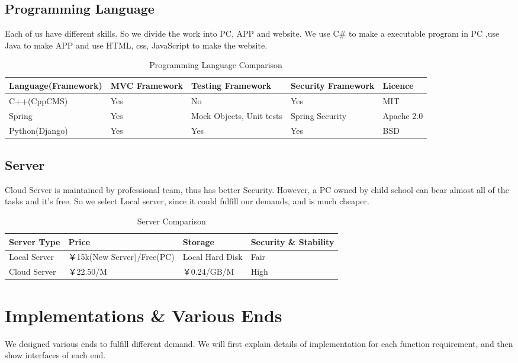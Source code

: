\documentclass{article}
\begin{document}
\subsection{Programming Language}
Each of us have different skills. So we divide the work into PC, APP and website. We use C\# to make a executable program in PC ,use Java to make APP and use HTML, css, JavaScript to make the website.

\begin{table}[htbp]
\centering
  \begin{tabular}{|l|p{2cm}|p{2cm}|p{2cm}|p{2cm}|}
  \hline
   Language(Framework) & MVC Framework & Testing Framework & Security Framework & Licence\\
    \hline
   C++(CppCMS) & Yes & No & Yes & MIT\\
    \hline

   Spring & Yes & Mock Objects, Unit tests & Spring Security & Apache 2.0\\
       \hline

   Python(Django) & Yes & Yes & Yes & BSD \\   
	\hline
     \end{tabular}
  \caption{Programming Language Comparison}
\end{table}

\subsection{Server}
Cloud Server is maintained by professional team, thus has better Security. However, a PC owned by child school can bear almost all of the tasks and it's free. So we select Local server, since it could fulfill our demands, and is much cheaper.

\begin{table}[htbp]
\centering
\begin{tabular}{|l|l|l|l|}
	\hline
	Server Type & Price & Storage & Security \& Stability \\
	\hline
	Local Server & ￥15k(New Server)/Free(PC) & Local Hard Disk & Fair \\
	\hline
	Cloud Server & ￥22.50/M & ￥0.24/GB/M & High \\
	\hline
	
\end{tabular}
	\caption{Server Comparison}
\end{table}

\section{Implementations \& Various Ends}
We designed various ends to fulfill different demand. We will first explain details of implementation for each function requirement, and then show interfaces of each end.
\end{document}

